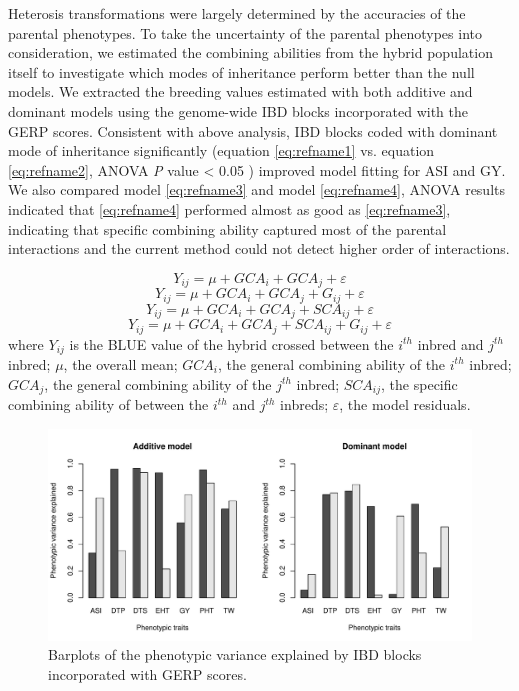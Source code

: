\documentclass[9pt,twocolumn,twoside]{gsajnl}
\begin{document}
Heterosis transformations were largely determined by the accuracies of the parental phenotypes. To take the uncertainty of the parental phenotypes into consideration, we estimated the combining abilities from the hybrid population itself to investigate which modes of inheritance perform better than the null models. We extracted the breeding values estimated with both additive and dominant models using the genome-wide IBD blocks incorporated with the GERP scores. Consistent with above analysis, IBD blocks coded with dominant mode of inheritance significantly (equation \ref{eq:refname1} vs. equation \ref{eq:refname2}, ANOVA \emph{P} value < 0.05 ) improved model fitting for ASI and GY. We also compared model \ref{eq:refname3} and model \ref{eq:refname4}, ANOVA results indicated that \ref{eq:refname4} performed almost as good as \ref{eq:refname3}, indicating that specific combining ability captured most of the parental interactions and the current method could not detect higher order of interactions. 

\begin{equation}
Y_{ij} = \mu + GCA_{i} + GCA_{j} + \varepsilon
\label{eq:refname1}
\end{equation}
\begin{equation}
Y_{ij} = \mu + GCA_{i} + GCA_{j} +  G_{ij} + \varepsilon
\label{eq:refname2}
\end{equation}
\begin{equation}
Y_{ij} = \mu + GCA_{i} + GCA_{j} + SCA_{ij} + \varepsilon
\label{eq:refname3}
\end{equation}
\begin{equation}
Y_{ij} = \mu + GCA_{i} + GCA_{j} + SCA_{ij} + G_{ij} + \varepsilon
\label{eq:refname4}
\end{equation}
where 
$Y_{ij}$ is the BLUE value of the hybrid crossed between the $i^{th}$ inbred and $j^{th}$ inbred; 
$\mu$, the overall mean; 
$GCA_{i}$, the general combining ability of the $i^{th}$ inbred;
$GCA_{j}$, the general combining ability of the $j^{th}$ inbred;
$SCA_{ij}$, the specific combining ability of between the $i^{th}$ and $j^{th}$ inbreds;
$\varepsilon$, the model residuals.

\begin{figure}[htbp]
\centering
\includegraphics[width=\linewidth]{Figure_h2.pdf}
\caption{Barplots of the phenotypic variance explained by IBD blocks incorporated with GERP scores.}
\label{fig:h2}
\end{figure}
\end{document}
